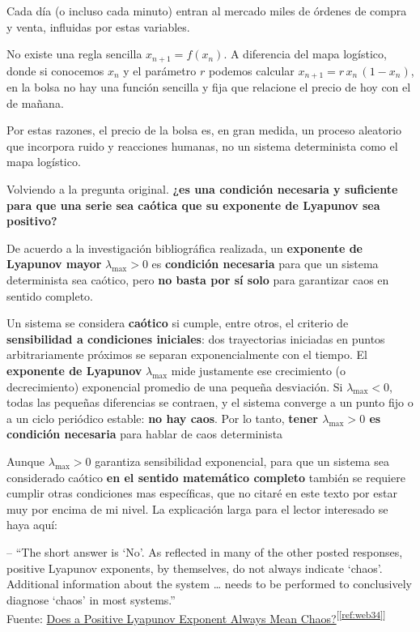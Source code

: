 \documentclass[
  10pt,
  a4paper,
  DIV=11,
  numbers=noendperiod,
  open=any]{scrreprt}
\numberwithin{equation}{chapter}
\numberwithin{equation}{section}
\renewcommand{\[}{\begin{equation}}
\renewcommand{\]}{\end{equation}}
\newcommand{\refweb}[3]{%
  \href{#1}{#2}\textsuperscript{[\ref{ref:#3}]}%
}
\begin{document}
Cada día (o incluso cada minuto) entran al mercado miles de órdenes de
compra y venta, influidas por estas variables.

No existe una regla sencilla \(x_{n+1} = f(x_n)\). A diferencia del mapa
logístico, donde si conocemos \(x_n\) y el parámetro \(r\) podemos
calcular \(x_{n+1} = r\,x_n\,(1 - x_n)\), en la bolsa no hay una función
sencilla y fija que relacione el precio de hoy con el de mañana.

Por estas razones, el precio de la bolsa es, en gran medida, un proceso
aleatorio que incorpora ruido y reacciones humanas, no un sistema
determinista como el mapa logístico.

Volviendo a la pregunta original. \textbf{¿es una condición necesaria y
suficiente para que una serie sea caótica que su exponente de Lyapunov
sea positivo?}

De acuerdo a la investigación bibliográfica realizada, un
\textbf{exponente de Lyapunov mayor} \(\lambda_{\max} > 0\) es
\textbf{condición necesaria} para que un sistema determinista sea
caótico, pero \textbf{no basta por sí solo} para garantizar caos en
sentido completo.

Un sistema se considera \textbf{caótico} si cumple, entre otros, el
criterio de \textbf{sensibilidad a condiciones iniciales}: dos
trayectorias iniciadas en puntos arbitrariamente próximos se separan
exponencialmente con el tiempo. El \textbf{exponente de Lyapunov}
\(\lambda_{\max}\) mide justamente ese crecimiento (o decrecimiento)
exponencial promedio de una pequeña desviación. Si
\(\lambda_{\max} < 0\), todas las pequeñas diferencias se contraen, y el
sistema converge a un punto fijo o a un ciclo periódico estable:
\textbf{no hay caos}. Por lo tanto, \textbf{tener \(\lambda_{\max} > 0\)
es condición necesaria} para hablar de caos determinista

Aunque \(\lambda_{\max} > 0\) garantiza sensibilidad exponencial, para
que un sistema sea considerado caótico \textbf{en el sentido matemático
completo} también se requiere cumplir otras condiciones mas específicas,
que no citaré en este texto por estar muy por encima de mi nivel. La
explicación larga para el lector interesado se haya aquí:

-- ``The short answer is `No'. As reflected in many of the other posted
responses, positive Lyapunov exponents, by themselves, do not always
indicate `chaos'. Additional information about the system \ldots{} needs
to be performed to conclusively diagnose `chaos' in most systems.''\\
Fuente: \refweb{https://www.researchgate.net/post/Does-positive-Lyapunov-exponent-always-mean-chaos}{Does a Positive Lyapunov Exponent Always Mean Chaos?}{web34}
\end{document}
